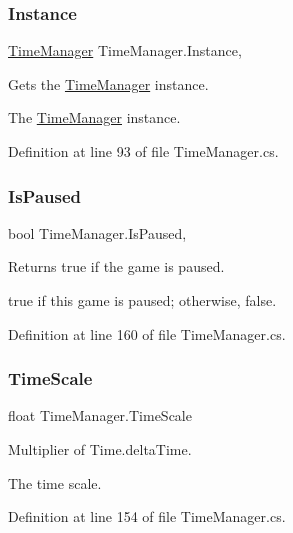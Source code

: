 \subsubsection{\texorpdfstring{Instance}{Instance}}
{\footnotesize\ttfamily \hyperlink{class_time_manager}{Time\+Manager} Time\+Manager.\+Instance\hspace{0.3cm}{\ttfamily [static]}, {\ttfamily [get]}}



Gets the \hyperlink{class_time_manager}{Time\+Manager} instance. 

The \hyperlink{class_time_manager}{Time\+Manager} instance.

Definition at line 93 of file Time\+Manager.\+cs.

\mbox{\label{class_time_manager_af2072e9048d854f66fc5b7eb48d3c4af}} 
\subsubsection{\texorpdfstring{Is\+Paused}{IsPaused}}
{\footnotesize\ttfamily bool Time\+Manager.\+Is\+Paused\hspace{0.3cm}{\ttfamily [get]}, {\ttfamily [set]}}



Returns true if the game is paused. 

{\ttfamily true} if this game is paused; otherwise, {\ttfamily false}.

Definition at line 160 of file Time\+Manager.\+cs.

\mbox{\label{class_time_manager_a2ecf6c84dc9909554b89db8a29edca76}} 
\subsubsection{\texorpdfstring{Time\+Scale}{TimeScale}}
{\footnotesize\ttfamily float Time\+Manager.\+Time\+Scale\hspace{0.3cm}{\ttfamily [get]}}



Multiplier of Time.\+delta\+Time. 

The time scale.

Definition at line 154 of file Time\+Manager.\+cs.

